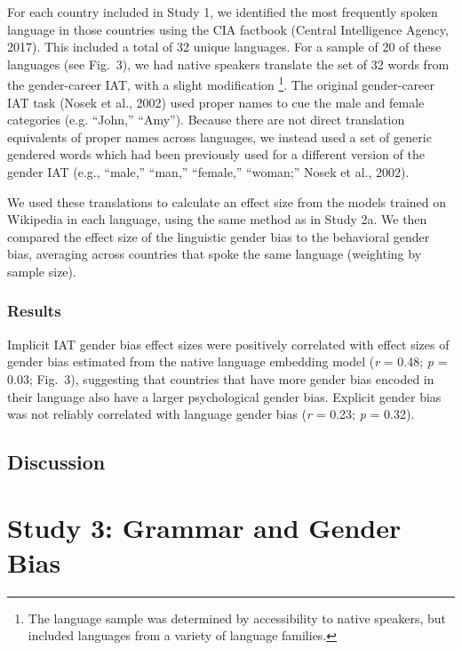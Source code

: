 \documentclass[10pt, letterpaper]{article}
\begin{document}
For each country included in Study 1, we identified the most frequently
spoken language in those countries using the CIA factbook (Central
Intelligence Agency, 2017). This included a total of 32 unique
languages. For a sample of 20 of these languages (see Fig.~3), we had
native speakers translate the set of 32 words from the gender-career
IAT, with a slight modification
\footnote{The language sample was determined by accessibility to native speakers, but included languages from a variety of language families.}.
The original gender-career IAT task (Nosek et al., 2002) used proper
names to cue the male and female categories (e.g. ``John,'' ``Amy'').
Because there are not direct translation equivalents of proper names
across languages, we instead used a set of generic gendered words which
had been previously used for a different version of the gender IAT
(e.g., ``male,'' ``man,'' ``female,'' ``woman;'' Nosek et al., 2002).

We used these translations to calculate an effect size from the models
trained on Wikipedia in each language, using the same method as in Study
2a. We then compared the effect size of the linguistic gender bias to
the behavioral gender bias, averaging across countries that spoke the
same language (weighting by sample size).

\subsubsection{Results}\label{results-2}

Implicit IAT gender bias effect sizes were positively correlated with
effect sizes of gender bias estimated from the native language embedding
model (\emph{r} = 0.48; \emph{p} = 0.03; Fig.~3), suggesting that
countries that have more gender bias encoded in their language also have
a larger psychological gender bias. Explicit gender bias was not
reliably correlated with language gender bias (\emph{r} = 0.23; \emph{p}
= 0.32).

\subsection{Discussion}\label{discussion-1}

\section{Study 3: Grammar and Gender
Bias}\label{study-3-grammar-and-gender-bias}
\end{document}
